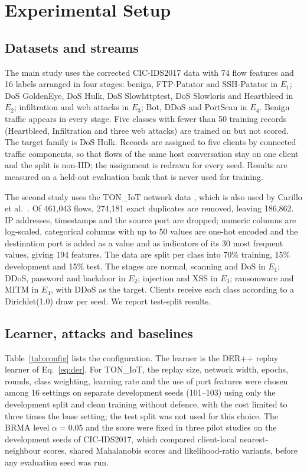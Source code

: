 \documentclass[pdflatex,sn-mathphys-num]{sn-jnl}
\theoremstyle{thmstyleone}
\theoremstyle{thmstylethree}
\begin{document}
\section{Experimental Setup}\label{sec:setup}
\subsection{Datasets and streams}
The main study uses the corrected CIC-IDS2017 data \cite{dataset,engelen,liu} with 74 flow features and 16 labels arranged in four stages: benign, FTP-Patator and SSH-Patator in $E_1$; DoS GoldenEye, DoS Hulk, DoS Slowhttptest, DoS Slowloris and Heartbleed in $E_2$; infiltration and web attacks in $E_3$; Bot, DDoS and PortScan in $E_4$. Benign traffic appears in every stage. Five classes with fewer than 50 training records (Heartbleed, Infiltration and three web attacks) are trained on but not scored. The target family is DoS Hulk. Records are assigned to five clients by connected traffic components, so that flows of the same host conversation stay on one client and the split is non-IID; the assignment is redrawn for every seed. Results are measured on a held-out evaluation bank that is never used for training.

The second study uses the TON\_IoT network data \cite{moustafa,booij}, which is also used by Carillo et al.\ \cite{carillo}. Of 461{,}043 flows, 274{,}181 exact duplicates are removed, leaving 186{,}862. IP addresses, timestamps and the source port are dropped; numeric columns are log-scaled, categorical columns with up to 50 values are one-hot encoded and the destination port is added as a value and as indicators of its 30 most frequent values, giving 194 features. The data are split per class into 70\% training, 15\% development and 15\% test. The stages are normal, scanning and DoS in $E_1$; DDoS, password and backdoor in $E_2$; injection and XSS in $E_3$; ransomware and MITM in $E_4$, with DDoS as the target. Clients receive each class according to a Dirichlet(1.0) draw per seed. We report test-split results.

\subsection{Learner, attacks and baselines}
Table~\ref{tab:config} lists the configuration. The learner is the DER++ replay learner of Eq.~\eqref{eq:der}. For TON\_IoT, the replay size, network width, epochs, rounds, class weighting, learning rate and the use of port features were chosen among 16 settings on separate development seeds (101--103) using only the development split and clean training without defence, with the cost limited to three times the base setting; the test split was not used for this choice. The BRMA level $\alpha=0.05$ and the score were fixed in three pilot studies on the development seeds of CIC-IDS2017, which compared client-local nearest-neighbour scores, shared Mahalanobis scores and likelihood-ratio variants, before any evaluation seed was run.
\end{document}
